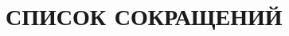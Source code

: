 




\setcounter{page}{2}

\renewcommand{\contentsname}{СОДЕРЖАНИЕ}
\begingroup
\titleformat{\section}{\bfseries\centering}{\thesection}{0.5em}{}
\tableofcontents
\endgroup
\newpage

\section*{\hspace*{\gostindent}СПИСОК СОКРАЩЕНИЙ}

